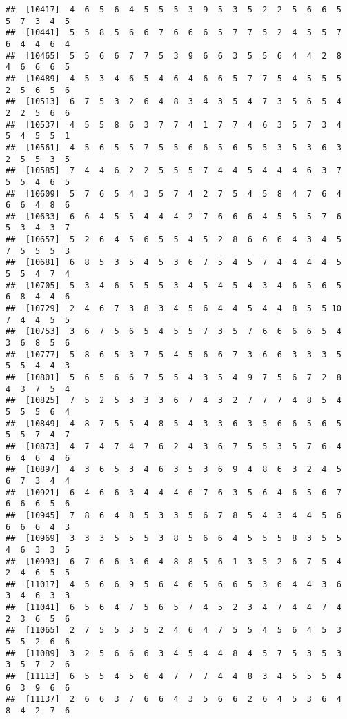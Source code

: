 \documentclass[
]{book}
\begin{document}
\begin{verbatim}
##  [10417]  4  6  5  6  4  5  5  5  3  9  5  3  5  2  2  5  6  6  5  5  7  3  4  5
##  [10441]  5  5  8  5  6  6  7  6  6  6  5  7  7  5  2  4  5  5  7  6  4  4  6  4
##  [10465]  5  5  6  6  7  7  5  3  9  6  6  3  5  5  6  4  4  2  8  4  6  6  6  5
##  [10489]  4  5  3  4  6  5  4  6  4  6  6  5  7  7  5  4  5  5  5  2  5  6  5  6
##  [10513]  6  7  5  3  2  6  4  8  3  4  3  5  4  7  3  5  6  5  4  2  2  5  6  6
##  [10537]  4  5  5  8  6  3  7  7  4  1  7  7  4  6  3  5  7  3  4  5  4  5  5  1
##  [10561]  4  5  6  5  5  7  5  5  6  6  5  6  5  5  3  5  3  6  3  2  5  5  3  5
##  [10585]  7  4  4  6  2  2  5  5  5  7  4  4  5  4  4  4  6  3  7  5  5  4  6  5
##  [10609]  5  7  6  5  4  3  5  7  4  2  7  5  4  5  8  4  7  6  4  6  6  4  8  6
##  [10633]  6  6  4  5  5  4  4  4  2  7  6  6  6  4  5  5  5  7  6  5  3  4  3  7
##  [10657]  5  2  6  4  5  6  5  5  4  5  2  8  6  6  6  4  3  4  5  7  5  5  5  3
##  [10681]  6  8  5  3  5  4  5  3  6  7  5  4  5  7  4  4  4  4  5  5  5  4  7  4
##  [10705]  5  3  4  6  5  5  5  3  4  5  4  5  4  3  4  6  5  6  5  6  8  4  4  6
##  [10729]  2  4  6  7  3  8  3  4  5  6  4  4  5  4  4  8  5  5 10  7  4  4  5  5
##  [10753]  3  6  7  5  6  5  4  5  5  7  3  5  7  6  6  6  6  5  4  3  6  8  5  6
##  [10777]  5  8  6  5  3  7  5  4  5  6  6  7  3  6  6  3  3  3  5  5  5  4  4  3
##  [10801]  5  6  5  6  6  7  5  5  4  3  5  4  9  7  5  6  7  2  8  4  3  7  5  4
##  [10825]  7  5  2  5  3  3  3  6  7  4  3  2  7  7  7  4  8  5  4  5  5  5  6  4
##  [10849]  4  8  7  5  5  4  8  5  4  3  3  6  3  5  6  6  5  6  5  5  5  7  4  7
##  [10873]  4  7  4  7  4  7  6  2  4  3  6  7  5  5  3  5  7  6  4  6  4  6  4  6
##  [10897]  4  3  6  5  3  4  6  3  5  3  6  9  4  8  6  3  2  4  5  6  7  3  4  4
##  [10921]  6  4  6  6  3  4  4  4  6  7  6  3  5  6  4  6  5  6  7  6  6  6  5  6
##  [10945]  7  8  6  4  8  5  3  3  5  6  7  8  5  4  3  4  4  5  6  6  6  6  4  3
##  [10969]  3  3  3  5  5  5  3  8  5  6  6  4  5  5  5  8  3  5  5  4  6  3  3  5
##  [10993]  6  7  6  6  3  6  4  8  8  5  6  1  3  5  2  6  7  5  4  2  4  6  5  5
##  [11017]  4  5  6  6  9  5  6  4  6  5  6  6  5  3  6  4  4  3  6  3  4  6  3  3
##  [11041]  6  5  6  4  7  5  6  5  7  4  5  2  3  4  7  4  4  7  4  2  3  6  5  6
##  [11065]  2  7  5  5  3  5  2  4  6  4  7  5  5  4  5  6  4  5  3  5  5  2  6  6
##  [11089]  3  2  5  6  6  6  3  4  5  4  4  8  4  5  7  5  3  5  3  3  5  7  2  6
##  [11113]  6  5  5  4  5  6  4  7  7  7  4  4  8  3  4  5  5  5  4  6  3  9  6  6
##  [11137]  2  6  6  3  7  6  6  4  3  5  6  6  2  6  4  5  3  6  4  8  4  2  7  6

\end{verbatim}
\end{document}

